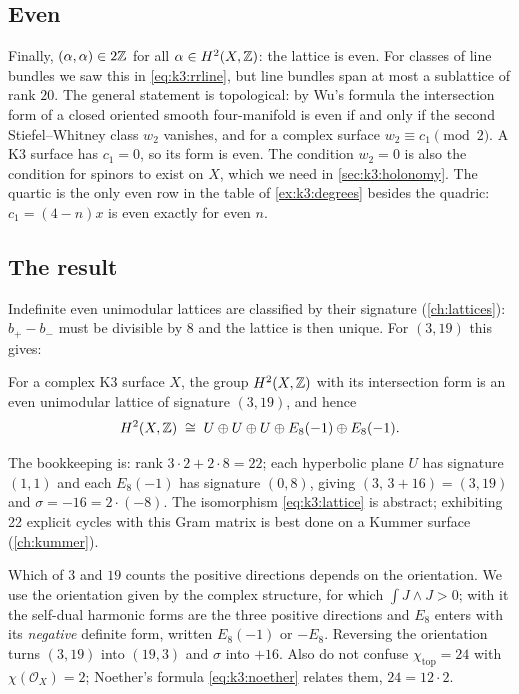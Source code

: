\subsection{Even}

Finally, $(\alpha,\alpha)\in2\mathbb{Z}$ for all $\alpha\in H^2(X,\mathbb{Z})$: the lattice is
even. For classes of line bundles we saw this in \eqref{eq:k3:rrline},
but line bundles span at most a sublattice of rank $20$. The general statement is topological:
by Wu's formula the intersection form of a closed oriented smooth four-manifold is even if
and only if the second Stiefel--Whitney class $w_2$ vanishes, and for a complex surface
$w_2\equiv c_1\pmod 2$. A K3 surface has $c_1=0$, so its form is even. \TL{}
 The condition
$w_2=0$ is also the condition for spinors to exist on $X$, which we need in
\cref{sec:k3:holonomy}. The quartic is the only even row in the table of
\cref{ex:k3:degrees} besides the quadric: $c_1=(4-n)x$ is even exactly for even $n$.

\subsection{The result}

Indefinite even unimodular lattices are classified by their signature (\cref{ch:lattices}):
$b_+-b_-$ must be divisible by $8$ and the lattice is then unique. For $(3,19)$ this gives:

\begin{theorem}\label{thm:k3:lattice}
For a complex K3 surface $X$, the group $H^2(X,\mathbb{Z})$ with its intersection form is an even
unimodular lattice of signature $(3,19)$, and hence
\begin{equation}\label{eq:k3:lattice}
  H^2(X,\mathbb{Z})\;\cong\;U\oplus U\oplus U\oplus E_8(-1)\oplus E_8(-1).
\end{equation}
\TL{} 
\end{theorem}

The bookkeeping is: rank $3\cdot2+2\cdot8=22$; each hyperbolic plane $U$ has signature
$(1,1)$ and each $E_8(-1)$ has signature $(0,8)$, giving $(3,\,3+16)=(3,19)$ and
$\sigma=-16=2\cdot(-8)$. The isomorphism \eqref{eq:k3:lattice} is abstract; exhibiting 22
explicit cycles with this Gram matrix is best done on a Kummer surface (\cref{ch:kummer}).

\begin{pitfallbox}
Which of $3$ and $19$ counts the positive directions depends on the orientation. We use the
orientation given by the complex structure, for which $\int J\wedge J>0$; with it the
self-dual harmonic forms are the three positive directions and $E_8$ enters with its
\emph{negative} definite form, written $E_8(-1)$ or $-E_8$. Reversing the orientation turns
$(3,19)$ into $(19,3)$ and $\sigma$ into $+16$. Also do not confuse $\chi_{\mathrm{top}}=24$ with $\chi(\mathcal{O}_X)=2$; Noether's
formula \eqref{eq:k3:noether} relates them, $24=12\cdot2$.
\end{pitfallbox}

